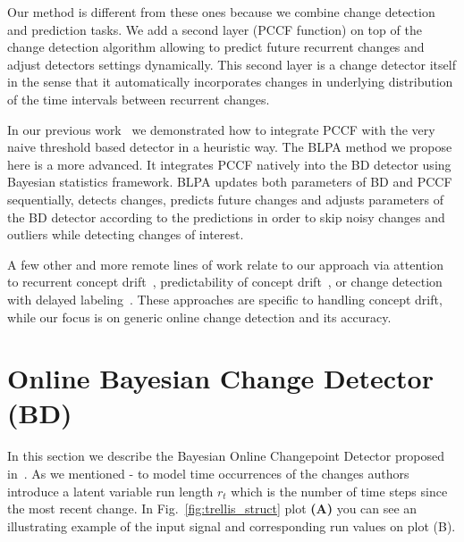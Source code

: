 Our method is different from these ones because we combine change detection and prediction tasks. 
We add a second layer (PCCF function) on top of the change detection algorithm allowing to predict future recurrent changes and adjust detectors settings dynamically.
This second layer is a change detector itself in the sense that it automatically incorporates changes in underlying distribution of the time intervals between recurrent changes.

In our previous work~\cite{MaslovSDM2016} we demonstrated how to integrate PCCF with the very naive threshold based detector in a heuristic way. 
The BLPA method we propose here is a more advanced.
It integrates PCCF natively into the BD detector using Bayesian statistics framework.
BLPA updates both parameters of BD and PCCF sequentially, detects changes, predicts future changes and adjusts parameters of the BD detector according to the predictions in order to skip noisy changes and outliers while detecting changes of interest.

A few other and more remote lines of work relate to our approach via attention to recurrent concept drift~\cite{GamaK11,DBLP:journals/tnn/GomesGSR14,DBLP:journals/ida/GomesSR12}, predictability of concept drift~\cite{Ang2013}, or change detection with delayed labeling~\cite{DBLP:conf/icdm/Zliobaite10}.
These approaches are specific to handling concept drift, while our focus is on generic online change detection and its accuracy.


\section{Online Bayesian Change Detector (BD)}
\label{sec:bd_detector}
In this section we describe the Bayesian Online Changepoint Detector proposed in~\cite{mackay2007}.
As we mentioned - to model time occurrences of the changes authors introduce a latent variable run length $r_t$ which is the number of time steps since the most recent change.
In Fig.~\ref{fig:trellis_struct} plot \textbf{(A)} you can see an illustrating example of the input signal and corresponding run values on plot (B).


